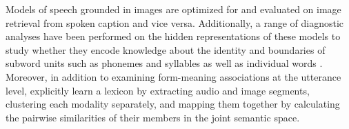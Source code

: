 Models of speech grounded in images are optimized for and evaluated on
image retrieval from spoken caption and vice versa. Additionally, a range of
diagnostic analyses have been performed on the hidden
representations of these models to study whether they encode knowledge
about the identity and boundaries of subword units such as phonemes
and syllables \cite{alishahi-etal-2017-encoding, harwath2019towards,
  khorrami_2021} as well as individual words
\cite{chrupala-etal-2017-representations,havard2019word}. Moreover, in
addition to examining form-meaning associations at the utterance
level, \citet{harwath2017learning} explicitly learn a lexicon by
extracting audio and image segments, clustering each modality
separately, and mapping them together by calculating the pairwise
similarities of their members in the joint semantic space.

